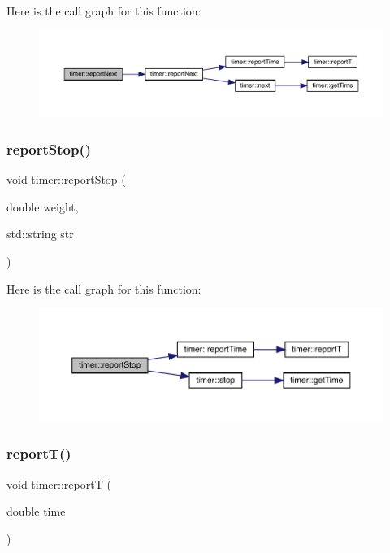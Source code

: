 Here is the call graph for this function\+:\nopagebreak
\begin{figure}[H]
\begin{center}
\leavevmode
\includegraphics[width=350pt]{structtimer_a7b1a86c7ecf45b606632f959ac4cd51e_cgraph}
\end{center}
\end{figure}
\mbox{\label{structtimer_a19e58704fe4de6c537dbe5aa2a3ce3c2}} 
\subsubsection{\texorpdfstring{reportStop()}{reportStop()}}
{\footnotesize\ttfamily void timer\+::report\+Stop (\begin{DoxyParamCaption}\item[{double}]{weight,  }\item[{std\+::string}]{str }\end{DoxyParamCaption})\hspace{0.3cm}{\ttfamily [inline]}}

Here is the call graph for this function\+:\nopagebreak
\begin{figure}[H]
\begin{center}
\leavevmode
\includegraphics[width=350pt]{structtimer_a19e58704fe4de6c537dbe5aa2a3ce3c2_cgraph}
\end{center}
\end{figure}
\mbox{\label{structtimer_a18f1ffc85c804ee50a0e835c07abe5b2}} 
\subsubsection{\texorpdfstring{reportT()}{reportT()}}
{\footnotesize\ttfamily void timer\+::reportT (\begin{DoxyParamCaption}\item[{double}]{time }\end{DoxyParamCaption})\hspace{0.3cm}{\ttfamily [inline]}}

